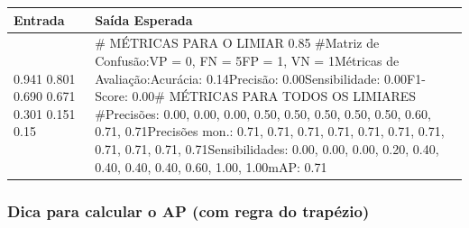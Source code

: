 \documentclass[
  portuguese,
  letterpaper,
  openany,
  oneside,
  12pt,
  a4paper]{book}
\begin{document}
\begin{longtable}[]{@{}
  >{\raggedright\arraybackslash}p{}
  >{\raggedright\arraybackslash}p{}@{}}
\toprule\noalign{}
\begin{minipage}[b]{\linewidth}\raggedright
Entrada
\end{minipage} & \begin{minipage}[b]{\linewidth}\raggedright
Saída Esperada
\end{minipage} \\
\midrule\noalign{}
\endhead
\bottomrule\noalign{}
\endlastfoot
70 0.941 0.801 0.690 0.671 0.301 0.151 0.15 & \# MÉTRICAS PARA O LIMIAR
0.85 \#Matriz de Confusão:VP = 0, FN = 5FP = 1, VN = 1Métricas de
Avaliação:Acurácia: 0.14Precisão: 0.00Sensibilidade: 0.00F1-Score:
0.00\# MÉTRICAS PARA TODOS OS LIMIARES \#Precisões: 0.00, 0.00, 0.00,
0.50, 0.50, 0.50, 0.50, 0.50, 0.60, 0.71, 0.71Precisões mon.: 0.71,
0.71, 0.71, 0.71, 0.71, 0.71, 0.71, 0.71, 0.71, 0.71,
0.71Sensibilidades: 0.00, 0.00, 0.00, 0.20, 0.40, 0.40, 0.40, 0.40,
0.60, 1.00, 1.00mAP: 0.71 \\
\end{longtable}

\subsubsection{\texorpdfstring{ Dica para calcular o AP
(com regra do
trapézio)}{ Dica para calcular o AP (com regra do trapézio)}}\label{dica-para-calcular-o-ap-com-regra-do-trapuxe9zio}
\end{document}
